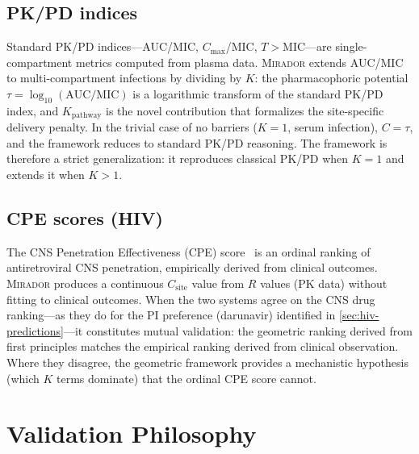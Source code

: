 \documentclass[11pt]{article}
\theoremstyle{plain}
\theoremstyle{definition}
\newcommand{\mirador}{\textsc{Mirador}}
\newcommand{\Kpath}{K_{\mathrm{pathway}}}
\begin{document}
\subsection{PK/PD indices}
\label{sec:rel-pkpd}

Standard PK/PD indices---AUC/MIC, $C_{\max}$/MIC,
$T > \mathrm{MIC}$---are single-compartment metrics computed from
plasma data. \mirador{} extends AUC/MIC to multi-compartment
infections by dividing by $K$: the pharmacophoric potential
$\tau = \log_{10}(\mathrm{AUC}/\mathrm{MIC})$ is a logarithmic
transform of the standard PK/PD index, and $\Kpath$ is the novel
contribution that formalizes the site-specific delivery penalty.
In the trivial case of no barriers ($K = 1$, serum infection),
$C = \tau$, and the framework reduces to standard PK/PD reasoning.
The framework is therefore a strict generalization: it reproduces
classical PK/PD when $K = 1$ and extends it when $K > 1$.

\subsection{CPE scores (HIV)}
\label{sec:rel-cpe}

The CNS Penetration Effectiveness (CPE) score~\cite{Letendre2010}
is an ordinal ranking of antiretroviral CNS penetration, empirically
derived from clinical outcomes. \mirador{} produces a continuous
$C_{\mathrm{site}}$ value from $R$ values (PK data) without fitting
to clinical outcomes. When the two systems agree on the CNS drug
ranking---as they do for the PI preference (darunavir) identified
in \cref{sec:hiv-predictions}---it constitutes mutual validation:
the geometric ranking derived from first principles matches the
empirical ranking derived from clinical observation. Where they
disagree, the geometric framework provides a mechanistic hypothesis
(which $K$ terms dominate) that the ordinal CPE score cannot.

\section{Validation Philosophy}
\label{sec:validation}

\end{document}
